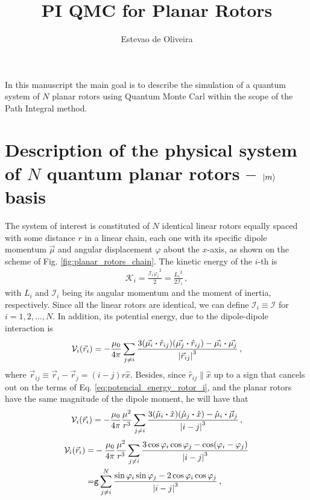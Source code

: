\documentclass[a4paper,11pt]{article}
\title{PI QMC for Planar Rotors}
\author{Estevao de Oliveira}
\newcommand{\1}{{\oper{I}}}
\newcommand{\+}{\uparrow}
\renewcommand{\-}{\downarrow}
\newcommand{\0}{0}
\begin{document}
	
	\maketitle
	
	\label{Introduction}
	\label{sec:intro}
	In this manuscript the main goal is to describe the simulation of a quantum system of $N$ planar rotors using Quantum Monte Carl within the scope of the Path Integral method.
	
\section{Description of the physical system of $N$ quantum planar rotors -- $\ket{m}$ basis}
\label{sec:system_description}

The system of interest is constituted of $N$ identical linear rotors equally spaced with some distance $r$ in a linear chain, each one with its specific dipole momentum $\vec{\mu}$ and angular displacement $\varphi$ about the $x$-axis, as shown on the scheme of Fig. \ref{fig:planar_rotors_chain}. The kinetic energy of the $i$-th is 
\begin{align}
	\mathcal{K}_i = \frac{\mathcal{I}_i {\dot{\varphi}_i}^2}{2} = \frac{{L_i}^2}{2\mathcal{I}_i}  \, ,
\end{align}
with $L_i$ and $\mathcal{I}_i$ being its angular momentum and the moment of inertia, respectively. Since all the linear rotors are identical, we can define $\mathcal{I}_i \equiv \mathcal{I}$ for $i=1,2,\dots, N$. In addition, its potential energy, due to the dipole-dipole interaction is
\begin{align}
	\label{eq:potencial_energy_rotor_i}
	\mathcal{V}_i(\vec{r}_i)
	=-\frac{\mu_0}{4\pi} \sum_{j \neq i} \frac{3(\vec{\mu_i}\vdot \hat{r}_{ij})(\vec{\mu_j}\vdot \hat{r}_{ij})-\vec{\mu_i}\vdot\vec{\mu_j}}{\abs{\vec{r}_{ij}}^3} \, ,
\end{align}
where $\vec{r}_{ij} \equiv \vec{r}_{i} - \vec{r}_{j} = (i-j)r \hat{x}$. Besides, since $\hat{r}_{ij} \parallel \hat{x}$ up to a sign that cancels out on the terms of Eq. \eqref{eq:potencial_energy_rotor_i}, and the planar rotors have the same magnitude of the dipole moment, he will have that
\begin{align}
	\label{eq:potencial_energy_rotor_i_2}
	\mathcal{V}_i(\vec{r}_i)
	=-\frac{\mu_0}{4\pi} \frac{\mu^2}{r^3} \sum_{j \neq i} \frac{3(\hat{\mu}_i\vdot \hat{x})(\hat{\mu}_j\vdot \hat{x})-\hat{\mu}_i\vdot\vec{\mu}_j}{\abs{i-j}^3} \, ,
\end{align}
\begin{align}
	\mathcal{V}_i(\vec{r}_i)
	=&-\frac{\mu_0}{4\pi} \frac{\mu^2}{r^3} \sum_{j \neq i} \frac{3\cos{\varphi_i} \cos{\varphi_j}- \cos(\varphi_i-\varphi_j)}{\abs{i-j}^3}
	\nonumber \\ 
	=&\texttt{g}\sum_{j\neq i}^N \frac{\sin{\varphi_i} \sin{\varphi_j} -2\cos{\varphi_i} \cos{\varphi_j}}{\abs{i-j}^3} \, ,
\end{align}
\end{document}
